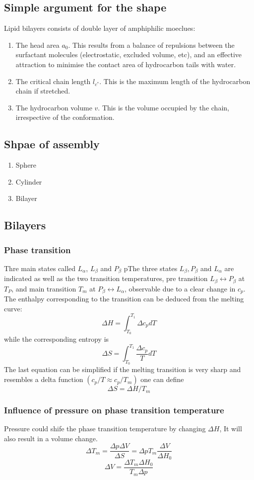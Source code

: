 \documentclass[12pt,a4paper]{article}
\begin{document}
\subsection{Simple argument for the shape}
Lipid bilayers consists of double layer of amphiphilic moeclues:
\begin{enumerate}
    \item The head area $a_0$. This results from a balance of repulsions between the surfactant molecules (electrostatic, excluded volume, etc), and an effective attraction to minimise the contact area of hydrocarbon tails with water.
    \item The critical chain length $l_{c^*}$. This is the maximum length of the hydrocarbon chain if stretched.
    \item The hydrocarbon volume $v$. This is the volume occupied by the chain, irrespective of the conformation.
\end{enumerate}
\subsection{Shpae of assembly}
\begin{enumerate}
    \item Sphere
    \item Cylinder
    \item Bilayer
\end{enumerate}
\subsection{ Bilayers}
\subsubsection{ Phase transition}
Thre main states called $L_{\alpha}$, $L_\beta$ and $P_\beta$
pThe three states $L_\beta, P_\beta$ and $L_\alpha$ are indicated as well as the two transition temperatures, pre transition $L_\beta \leftrightarrow P_\beta$ at $T_P$, and main transition $T_m$ at $P_\beta \leftrightarrow L_\alpha$, observable due to a clear change in $c_p$. The enthalpy corresponding to the transition can be deduced from the melting curve:
$$
\Delta H=\int_{T_0}^{T_1} \Delta c_p d T
$$
while the corresponding entropy is
$$
\Delta S=\int_{T_0}^{T_1} \frac{\Delta c_p}{T} d T
$$
The last equation can be simplified if the melting transition is very sharp and resembles a delta function $\left(c_p / T \approx c_p / T_m\right)$ one can define
$$
\Delta S=\Delta H / T_m
$$
\subsubsection{Influence of pressure on phase transition temperature}
Pressure could shife the phase transition temperature by changing $\Delta H$, It will also result in a volume change.
$$\Delta T_m=\frac{\Delta p \Delta V}{\Delta S}=\Delta p T_m \frac{\Delta V}{\Delta H_0}$$
$$\Delta V=\frac{\Delta T_m \Delta H_0}{T_m \Delta p}$$
\end{document}
